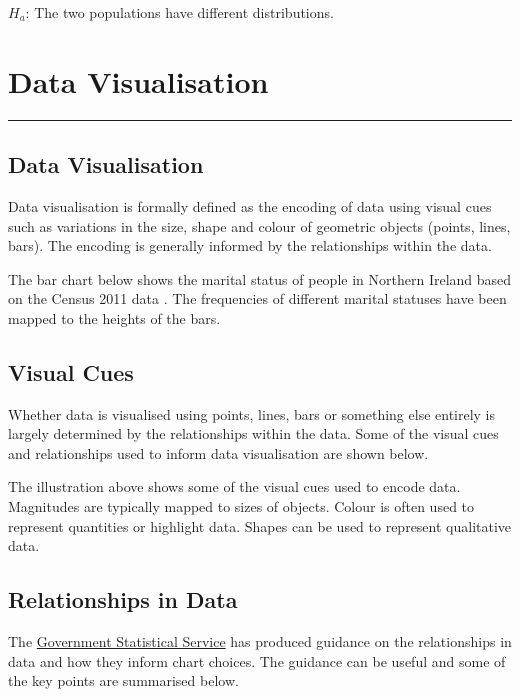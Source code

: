 \documentclass[
]{book}
\begin{document}
\(H_a\): The two populations have different distributions.

\hypertarget{datvis}{%
\chapter{Data Visualisation}\label{datvis}}

\begin{center}\rule{0.5\linewidth}{0.5pt}\end{center}

\hypertarget{data-visualisation}{%
\section{Data Visualisation}\label{data-visualisation}}

Data visualisation is formally defined as the encoding of data using visual cues such as variations in the size, shape and colour of geometric objects (points, lines, bars). The encoding is generally informed by the relationships within the data.

The bar chart below shows the marital status of people in Northern Ireland based on the Census 2011 data \citep{census2011}. The frequencies of different marital statuses have been mapped to the heights of the bars.

\hypertarget{visual-cues}{%
\section{Visual Cues}\label{visual-cues}}

Whether data is visualised using points, lines, bars or something else entirely is largely determined by the relationships within the data. Some of the visual cues and relationships used to inform data visualisation are shown below.

The illustration above shows some of the visual cues used to encode data. Magnitudes are typically mapped to sizes of objects. Colour is often used to represent quantities or highlight data. Shapes can be used to represent qualitative data.

\hypertarget{relationships-in-data}{%
\section{Relationships in Data}\label{relationships-in-data}}

The \href{https://analysisfunction.civilservice.gov.uk/policy-store/data-visualisation-charts/\#section-9}{Government Statistical Service} has produced guidance on the relationships in data and how they inform chart choices. The guidance can be useful and some of the key points are summarised below.
\end{document}
